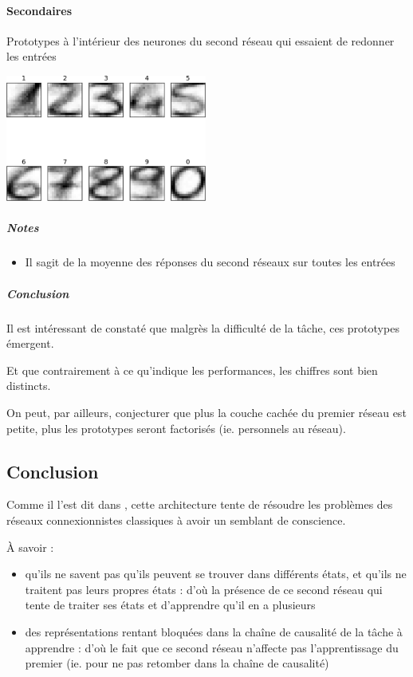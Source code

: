    \paragraph{Secondaires}
      Prototypes à l'intérieur des neurones du second réseau qui essaient de redonner les entrées
      \begin{center}
	\includegraphics[width=250px]{data/expA3/prototype.png}
      \end{center} 
      \subparagraph{Notes}
	\begin{itemize}
	  \item Il sagit de la moyenne des réponses du second réseaux sur toutes les entrées
	\end{itemize}
      \subparagraph{Conclusion}
	Il est intéressant de constaté que malgrès la difficulté de la tâche, ces prototypes émergent.
	
	Et que contrairement à ce qu'indique les performances, les chiffres sont bien distincts.
      
	On peut, par ailleurs, conjecturer que plus la couche cachée du premier réseau est petite, plus les prototypes 
	seront factorisés (ie. personnels au réseau).
	


  \subsection{Conclusion}
    Comme il l'est dit dans \cite{Cleeremans_2007}, cette architecture tente de résoudre les problèmes des réseaux connexionnistes
  classiques à avoir un semblant de conscience.
  
  À savoir :
  \begin{itemize}
   \item qu'ils ne savent pas qu'ils peuvent se trouver dans différents états, et qu'ils ne traitent pas leurs propres états : 
   d'où la présence de ce second réseau qui tente de traiter ses états et d'apprendre qu'il en a plusieurs
   \item des représentations rentant bloquées dans la chaîne de causalité de la tâche à apprendre : d'où
   le fait que ce second réseau n'affecte pas l'apprentissage du premier (ie. pour ne pas retomber dans la chaîne de causalité)
   \\[0.2cm]
  \end{itemize}
  
